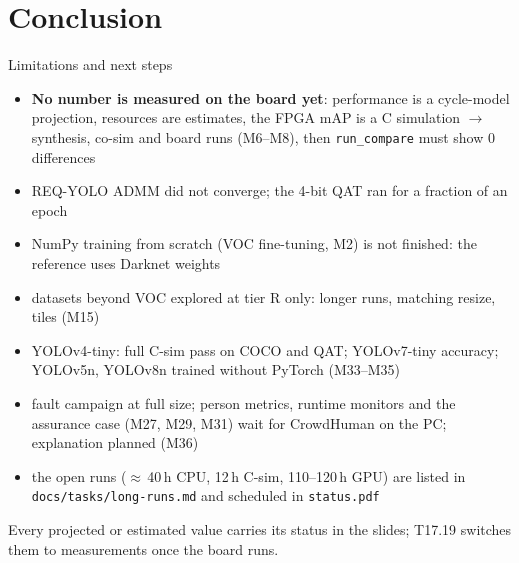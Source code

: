 \documentclass[aspectratio=169,11pt]{beamer}
\begin{document}
\section{Conclusion}

\begin{frame}{Limitations and next steps}
  \scriptsize
  \begin{itemize}
    \item \textbf{No number is measured on the board yet}: performance is a cycle-model
      projection, resources are estimates, the FPGA mAP is a C simulation $\to$ synthesis,
      co-sim and board runs (M6--M8), then \texttt{run\_compare} must show 0 differences
    \item REQ-YOLO ADMM did not converge; the 4-bit QAT ran for a fraction of an epoch
    \item NumPy training from scratch (VOC fine-tuning, M2) is not finished: the reference
      uses Darknet weights
    \item datasets beyond VOC explored at tier R only: longer runs, matching resize, tiles
      (M15)
    \item YOLOv4-tiny: full C-sim pass on COCO and QAT; YOLOv7-tiny accuracy; YOLOv5n,
      YOLOv8n trained without PyTorch (M33--M35)
    \item fault campaign at full size; person metrics, runtime monitors and the assurance
      case (M27, M29, M31) wait for CrowdHuman on the PC; explanation planned (M36)
    \item the open runs ($\approx$\,40\,h CPU, 12\,h C-sim, 110--120\,h GPU) are listed in
      \texttt{docs/tasks/long-runs.md} and scheduled in \texttt{status.pdf}
  \end{itemize}
  \medskip
  Every projected or estimated value carries its status in the slides; T17.19 switches
  them to measurements once the board runs.
\end{frame}
\end{document}
